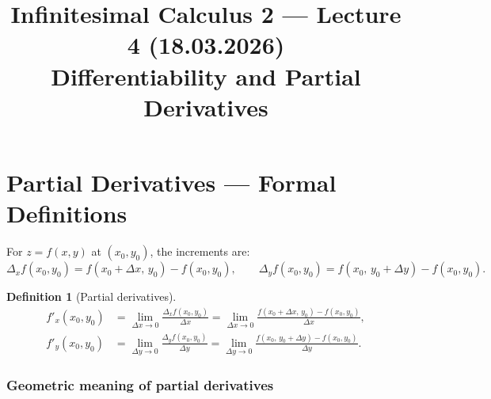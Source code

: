 \documentclass[12pt,a4paper]{article}
\title{Infinitesimal Calculus 2 --- Lecture 4 (18.03.2026)\\
\large Differentiability and Partial Derivatives}
\date{}
\newtheorem{definition}{Definition}
\begin{document}
\maketitle

\section*{Partial Derivatives --- Formal Definitions}

For $z = f(x,y)$ at $(x_0,y_0)$, the increments are:
\[
  \Delta_x f(x_0,y_0) = f(x_0+\Delta x,\,y_0) - f(x_0,y_0),\qquad
  \Delta_y f(x_0,y_0) = f(x_0,\,y_0+\Delta y) - f(x_0,y_0).
\]

\begin{definition}[Partial derivatives]
\begin{align*}
  f'_x(x_0,y_0) &= \lim_{\Delta x\to 0}\frac{\Delta_x f(x_0,y_0)}{\Delta x}
    = \lim_{\Delta x\to 0}\frac{f(x_0+\Delta x,\,y_0)-f(x_0,y_0)}{\Delta x},\\[6pt]
  f'_y(x_0,y_0) &= \lim_{\Delta y\to 0}\frac{\Delta_y f(x_0,y_0)}{\Delta y}
    = \lim_{\Delta y\to 0}\frac{f(x_0,\,y_0+\Delta y)-f(x_0,y_0)}{\Delta y}.
\end{align*}
\end{definition}

\subsubsection*{Geometric meaning of partial derivatives}
\end{document}
